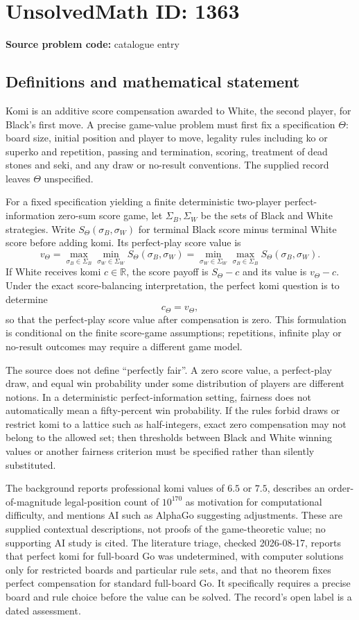 \documentclass[11pt]{article}
\newcommand{\R}{\mathbb{R}}
\begin{document}
\section*{UnsolvedMath ID: 1363}
\textbf{Source problem code:} catalogue entry
\subsection{Definitions and mathematical statement}
Komi is an additive score compensation awarded to White, the second player, for Black's first move. A precise game-value problem must first fix a specification $\Theta$: board size, initial position and player to move, legality rules including ko or superko and repetition, passing and termination, scoring, treatment of dead stones and seki, and any draw or no-result conventions. The supplied record leaves $\Theta$ unspecified.

For a fixed specification yielding a finite deterministic two-player perfect-information zero-sum score game, let $\Sigma_B,\Sigma_W$ be the sets of Black and White strategies. Write $S_\Theta(\sigma_B,\sigma_W)$ for terminal Black score minus terminal White score before adding komi. Its perfect-play score value is
\[
v_\Theta=\max_{\sigma_B\in\Sigma_B}\min_{\sigma_W\in\Sigma_W}S_\Theta(\sigma_B,\sigma_W)
=\min_{\sigma_W\in\Sigma_W}\max_{\sigma_B\in\Sigma_B}S_\Theta(\sigma_B,\sigma_W).
\]
If White receives komi $c\in\R$, the score payoff is $S_\Theta-c$ and its value is $v_\Theta-c$. Under the exact score-balancing interpretation, the perfect komi question is to determine
\[
c_\Theta=v_\Theta,
\]
so that the perfect-play score value after compensation is zero. This formulation is conditional on the finite score-game assumptions; repetitions, infinite play or no-result outcomes may require a different game model.

The source does not define ``perfectly fair''. A zero score value, a perfect-play draw, and equal win probability under some distribution of players are different notions. In a deterministic perfect-information setting, fairness does not automatically mean a fifty-percent win probability. If the rules forbid draws or restrict komi to a lattice such as half-integers, exact zero compensation may not belong to the allowed set; then thresholds between Black and White winning values or another fairness criterion must be specified rather than silently substituted.

The background reports professional komi values of $6.5$ or $7.5$, describes an order-of-magnitude legal-position count of $10^{170}$ as motivation for computational difficulty, and mentions AI such as AlphaGo suggesting adjustments. These are supplied contextual descriptions, not proofs of the game-theoretic value; no supporting AI study is cited. The literature triage, checked 2026-08-17, reports that perfect komi for full-board Go was undetermined, with computer solutions only for restricted boards and particular rule sets, and that no theorem fixes perfect compensation for standard full-board Go. It specifically requires a precise board and rule choice before the value can be solved. The record's open label is a dated assessment.
\end{document}
